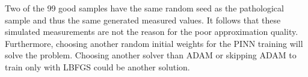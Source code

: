 \documentclass[a4paper,11pt]{article}
\begin{document}
Two of the 99 good samples have the same random seed as the pathological sample and thus the same generated measured values. It follows that these simulated measurements are not the reason for the poor approximation quality. Furthermore, choosing another random initial weights for the PINN training will solve the problem. Choosing another solver than ADAM or skipping ADAM to train only with LBFGS could be another solution.

\end{document}
